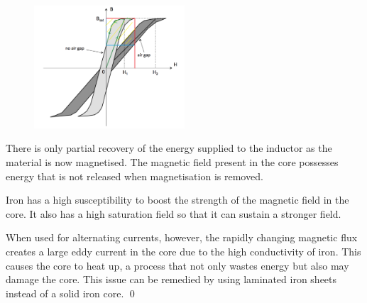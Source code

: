 \documentclass[12pt]{article}
\begin{document}
\begin{figure}[h]
    \centering
    \includegraphics[width=0.5\textwidth]{../plots/electro_2_8.png}
\end{figure}

There is only partial recovery of the energy supplied to the inductor as the material is now magnetised. The magnetic field present in the core possesses energy that is not released when magnetisation is removed.

Iron has a high susceptibility to boost the strength of the magnetic field in the core. It also has a high saturation field so that it can sustain a stronger field.

When used for alternating currents, however, the rapidly changing magnetic flux creates a large eddy current in the core due to the high conductivity of iron. This causes the core to heat up, a process that not only wastes energy but also may damage the core. This issue can be remedied by using laminated iron sheets instead of a solid iron core.
\qed
\end{document}
